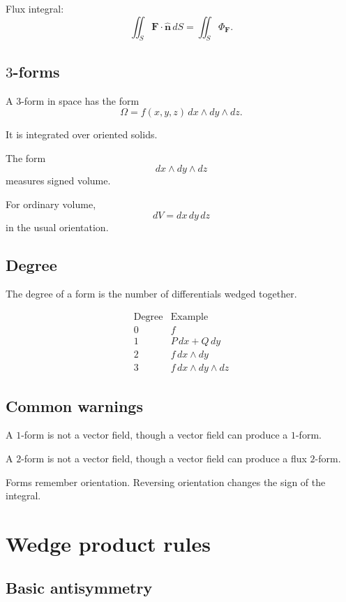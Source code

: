 Flux integral:
\[
\boxed{
    \iint_S \mathbf F\cdot\widehat{\mathbf n}\,dS
    =
    \iint_S \Phi_{\mathbf F}.
}
\]

\subsection*{\texorpdfstring{\(3\)}{3}-forms}

A \(3\)-form in space has the form
\[
\boxed{
    \Omega=f(x,y,z)\,dx\wedge dy\wedge dz.
}
\]

It is integrated over oriented solids.

The form
\[
\boxed{
    dx\wedge dy\wedge dz
}
\]
measures signed volume.

For ordinary volume,
\[
\boxed{
    dV=dx\,dy\,dz
}
\]
in the usual orientation.

\subsection*{Degree}

The degree of a form is the number of differentials wedged together.

\[
\begin{array}{c|c}
\text{Degree} & \text{Example} \\ \hline
0 & f\\
1 & P\,dx+Q\,dy\\
2 & f\,dx\wedge dy\\
3 & f\,dx\wedge dy\wedge dz
\end{array}
\]

\subsection*{Common warnings}

A \(1\)-form is not a vector field, though a vector field can produce a \(1\)-form.

A \(2\)-form is not a vector field, though a vector field can produce a flux \(2\)-form.

Forms remember orientation.  Reversing orientation changes the sign of the integral.

\section{Wedge product rules}
\label{app:E.2}

\subsection*{Basic antisymmetry}

